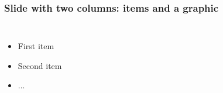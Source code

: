 \documentclass[mathserif]{beamer}
\begin{document}
\begin{frame}
  \frametitle{Slide with two columns: items and a graphic}   
  \begin{columns}[c]
  \column{2in}  %
  \begin{itemize}
  \item<1-> First item
  \item<2-> Second item
  \item<3-> ...
  \end{itemize}
  \column{2.5in}
  \end{columns}
\end{frame}
\end{document}

